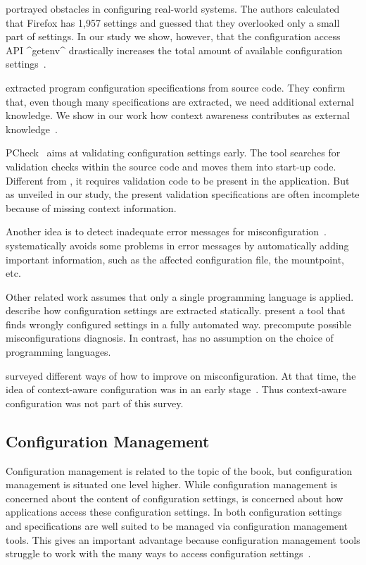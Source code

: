 \citet{jin2014configurations} portrayed obstacles in configuring real-world systems.
The authors calculated that Firefox has 1,957 settings and guessed that they overlooked only a small part of settings.
In our study we show, however, that the configuration access API ^getenv^ drastically increases the total amount of available configuration settings~\cite{raab2017introducing}.

\citet{nadi2014mining,rabkin2011static} extracted program configuration specifications from source code.
They confirm that, even though many specifications are extracted, we need additional external knowledge.
We show in our work how context awareness contributes as external knowledge~\cite{raab2016unanticipated}.

PCheck~\cite{xu2016early} aims at validating configuration settings early.
The tool searches for validation checks within the source code and moves them into start-up code.
Different from \elektra{}, it requires validation code to be present in the application.
But as unveiled in our study, the present validation specifications are often incomplete because of missing context information.

Another idea is to detect inadequate error messages for misconfiguration~\cite{zhang2015proactive}.
\elektra{} systematically avoids some problems in error messages by automatically adding important information, such as the affected configuration file, the mountpoint, etc.

Other related work assumes that only a single programming language is applied.
\citet{rabkin2011static} describe how configuration settings are extracted statically.
\citet{zhang2013automated} present a tool that finds wrongly configured settings in a fully automated way.
\citet{rabkin2011precomputing} precompute possible misconfigurations diagnosis.
In contrast, \elektra{} has no assumption on the choice of programming languages.

\citet{xu2015systems} surveyed different ways of how to improve on misconfiguration.
At that time, the idea of context-aware configuration was in an early stage~\cite{raab2014program}.
Thus context-aware configuration was not part of this survey.


\subsection{Configuration Management}
\label{sec:related-management}

Configuration management is related to the topic of the book, but configuration management is situated one level higher.
While configuration management is concerned about the content of configuration settings, \elektra{} is concerned about how applications access these configuration settings.
In \elektra{} both configuration settings and specifications are well suited to be managed via configuration management tools.
This gives an important advantage because configuration management tools struggle to work with the many ways to access configuration settings~\cite{burgess1995cfengine}.

